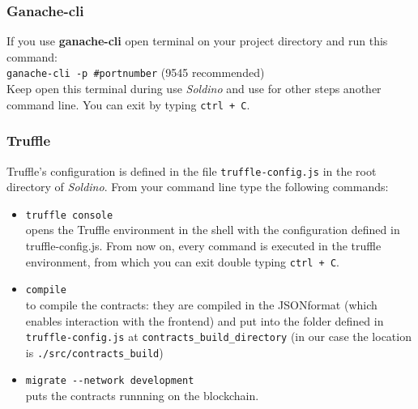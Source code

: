\subsubsection{Ganache-cli}
If you use \textbf{ganache-cli} open terminal on your project directory and run this command: \\
\texttt{ganache-cli -p \#portnumber} (9545 recommended)\\
Keep open this terminal during use \textit{Soldino} and use for other steps another command line.
You can exit by typing \texttt{ctrl + C}.

\subsubsection{Truffle}
Truffle's configuration is defined in the file \texttt{truffle-config.js} in the root directory of \textit{Soldino}.
From your command line type the following commands:
\begin{itemize}
	\item \texttt{truffle console}\\
	opens the Truffle environment in the shell with the configuration defined in truffle-config.js. From now on, every command is executed in the truffle environment, from which you can exit double typing \texttt{ctrl + C}.
	\item \texttt{compile}\\
	to compile the contracts: they are compiled in the JSON\glosp format (which enables interaction with the frontend) and put into the folder defined in \texttt{truffle-config.js} at \texttt{contracts\_build\_directory} (in our case the location is \texttt{./src/contracts\_build})
	\item \texttt{migrate -{}-network development}\\
	puts the contracts runnning on the blockchain\glo. 
\end{itemize}

